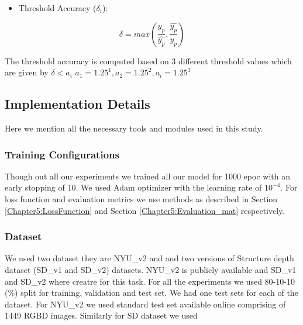 \begin{itemize}
    \item Threshold Accuracy (\(\delta_{i}\)): 
\end{itemize}{}

\begin{equation} \label{ThresholdAcc}
    {\delta = max (\frac{{y_{p}}}{\hat{y_{p}}}, \frac{\hat{y_{p}}}{{y_{p}}})}
\end{equation}

The threshold accuracy is computed based on 3 different threshold values which are given by \(\delta < a_{i}\)  \(a_{1}= 1.25^1, a_{2} = 1.25^2, a_{i} = 1.25^3\)  






\subsection{Implementation Details}
\label{Chapter5:HardwarSoftwareDetails}
Here we mention all the necessary tools and modules used in this study. 

 \subsubsection{Training Configurations} 
 \label{Chapter4:TrainConfigurations_i}

 Though out all our  experiments we trained all our model for 1000 epoc with an early stopping of 10. We used Adam \cite{kingma2014adam} optimizer with the learning rate of \(10^{-4}\). For loss function and evaluation metrics we use methods as described in Section \ref{Chapter5:LossFunction} and Section \ref{Chapter5:Evaluation_mat} respectively.
 
 \subsubsection{Dataset} 
  \label{Chapter4:DatasetForsplits-i}

 We used two dataset they are NYU\_v2 and and two versions of Structure depth dataset (SD\_v1 and SD\_v2) datasets. NYU\_v2 is publicly available and SD\_v1 and SD\_v2 where creatre for this task. For all the experiments we used 80-10-10 (\%) split for training, validation and test set. We had one test sets for each of the dataset. For NYU\_v2 we used standard test set available online comprising of 1449 RGBD images. Similarly for SD dataset we used 
 
